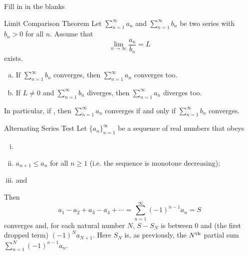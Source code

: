 \begin{frame}[t]{Fill in in the blanks}
\AnswerSpace
{}
\begin{block}{Limit Comparison Theorem}
Let $\sum_{n=1}^\infty a_n$ and $\sum_{n=1}^\infty b_n$ be two series with
$b_n>0$ for all $n$. Assume that
\begin{equation*}
\lim_{n\rightarrow\infty}\frac{a_n}{b_n}=L
\end{equation*}
exists.
\begin{enumerate}[(a)]
\item If $\sum_{n=1}^\infty b_n$  converges, then
$\sum_{n=1}^\infty a_n$ converges too.

\item If $L\ne 0$ and $\sum_{n=1}^\infty b_n$  diverges,
then $\sum_{n=1}^\infty a_n$ diverges too.
\end{enumerate}
In particular, if , then $\sum_{n=1}^\infty a_n$ converges
if and only if $\sum_{n=1}^\infty b_n$ converges.
\end{block}
\end{frame}
\begin{frame}[t]
\AnswerSpace
{}
\begin{block}{Alternating Series Test}
Let $\big\{a_n\big\}_{n=1}^\infty$
be a sequence of real numbers that obeys
\begin{enumerate}[(i)]
\item {}
\item $a_{n+1}\le a_n$  for all $n\ge 1$ (i.e. the
sequence is monotone decreasing);
\item  and 
\end{enumerate}
Then
\begin{equation*}
a_1-a_2+a_3-a_4+\cdots=\sum\limits_{n=1}^\infty (-1)^{n-1} a_n =S
\end{equation*}
converges and, for each natural number $N$,  $S-S_N$ is between $0$ and (the
first dropped term) $(-1)^N a_{N+1}$. Here $S_N$ is, as previously,
the $N^{\rm th}$ partial sum $\sum\limits_{n=1}^N (-1)^{n-1} a_n$.
\end{block}

\end{frame}
